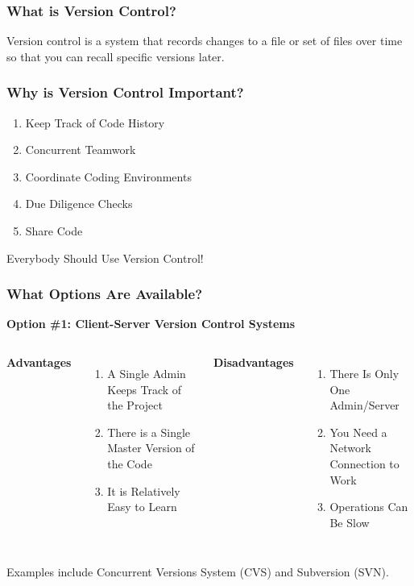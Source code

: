 \begin{frame}
\frametitle{\large{What is Version Control?}}
Version control is a system that records changes to a file or set of files over time so that you can recall specific versions later.
\end{frame}

\begin{frame}
\frametitle{\large{Why is Version Control Important?}}
\begin{enumerate}
\item Keep Track of Code History
\pause
\item Concurrent Teamwork
\pause
\item Coordinate Coding Environments
\pause
\item Due Diligence Checks
\pause
\item Share Code
\end{enumerate}
\pause
\vspace{5mm}
Everybody Should Use Version Control!
\end{frame}

\begin{frame}
\frametitle{\large{What Options Are Available?}}
\textbf{Option \#1: Client-Server Version Control Systems}
\vspace{8mm}
\begin{columns}[c]
\column{2in}
{\small \textbf{Advantages}}
\begin{enumerate}
\small 
\item A Single Admin Keeps Track of the Project
\item There is a Single Master Version of the Code
\item It is Relatively Easy to Learn
\end{enumerate}
\column{2in}
{\small \textbf{Disadvantages} }
\begin{enumerate}
\small
\item There Is Only One Admin/Server
\item You Need a Network Connection to Work
\item Operations Can Be Slow
\end{enumerate}
\end{columns}
\vspace{5mm}
{\small Examples include Concurrent Versions System (CVS) and Subversion (SVN).}
\end{frame}

